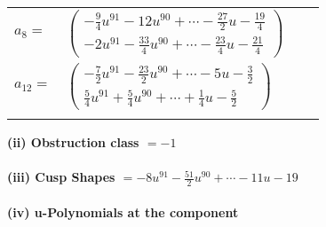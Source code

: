 \documentclass[1p]{elsarticle_modified}
\theoremstyle{definition}
\begin{document}
\begin{tabular}{m{7pt} m{180pt} m{7pt} m{180pt} }
\flushright $a_{8}=$&$\begin{pmatrix}-\frac{9}{4} u^{91}-12 u^{90}+\cdots-\frac{27}{2} u-\frac{19}{4}\\-2 u^{91}-\frac{33}{4} u^{90}+\cdots-\frac{23}{4} u-\frac{21}{4}\end{pmatrix}$ \\
\flushright $a_{12}=$&$\begin{pmatrix}-\frac{7}{2} u^{91}-\frac{23}{2} u^{90}+\cdots-5 u-\frac{3}{2}\\\frac{5}{4} u^{91}+\frac{5}{4} u^{90}+\cdots+\frac{1}{4} u-\frac{5}{2}\end{pmatrix}$\\&\end{tabular}
\flushleft \textbf{(ii) Obstruction class $= -1$}\\~\\
\flushleft \textbf{(iii) Cusp Shapes $= -8 u^{91}-\frac{51}{2} u^{90}+\cdots-11 u-19$}\\~\\
\newpage\renewcommand{\arraystretch}{1}
\flushleft \textbf{(iv) u-Polynomials at the component}\newline \\
\end{document}
